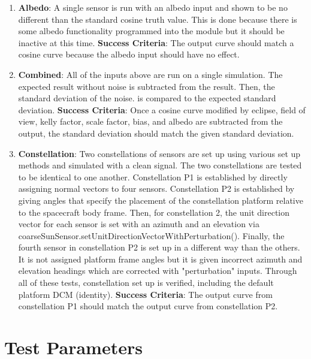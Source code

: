 \begin{enumerate}
	\item\textbf{Albedo}: A single sensor is run with an albedo input and shown to be no different than the standard cosine truth value. This is done because there is some albedo functionality programmed into the module but it should be inactive at this time.
	\subitem \textbf{Success Criteria}: The output curve should match a cosine curve because the albedo input should have no effect.
	\item\textbf{Combined}: All of the inputs above are run on a single simulation. The expected result without noise is subtracted from the result. Then, the standard deviation of the noise. is compared to the expected standard deviation.
	\subitem \textbf{Success Criteria}: Once a cosine curve modified by eclipse, field of view, kelly factor, scale factor, bias, and albedo are subtracted from the output, the standard deviation should match the given standard deviation.
	\item\textbf{Constellation}: Two constellations of sensors are set up using various set up methods and simulated with a clean signal. The two constellations are tested to be identical to one another. Constellation P1 is established by directly assigning normal vectors to four sensors. Constellation P2 is established by giving angles that specify the placement of the constellation platform relative to the spacecraft body frame. Then, for constellation 2, the unit direction vector for each sensor is set with an azimuth and an elevation via coarseSunSensor.setUnitDirectionVectorWithPerturbation(). Finally, the fourth sensor in constellation P2 is set up in a different way than the others. It is not assigned platform frame angles but it is given incorrect azimuth and elevation headings which are corrected with "perturbation" inputs. Through all of these tests, constellation set up is verified, including the default platform DCM (identity).
	\subitem \textbf{Success Criteria}: The output curve from constellation P1 should match the output curve from constellation P2.
\end{enumerate}


\section{Test Parameters}

